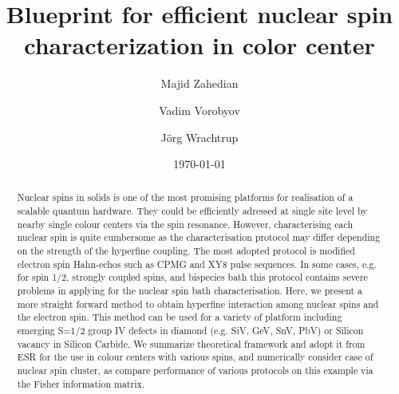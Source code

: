 \documentclass[%
 reprint,
superscriptaddress,
 amsmath,amssymb,
 aps,
]{revtex4-2}
\begin{document}

\title{Blueprint for efficient nuclear spin characterization in  color center}%

\author{Majid Zahedian}


\author{Vadim Vorobyov}

 
\author{J\"org Wrachtrup}

\date{\today}%

\begin{abstract}
Nuclear spins in solids is one of the most promising platforms for realisation of a scalable quantum hardware. They could be efficiently adressed at single site level by nearby single colour centers via the spin resonance. However, characterising each nuclear spin is quite cumbersome as the characterisation protocol may differ depending on the strength of the hyperfine coupling. The most adopted protocol is modified electron spin Hahn-echos such as CPMG and XY8 pulse sequences. In some cases, e.g. for spin 1/2, strongly coupled spins, and bispecies bath this protocol contains severe problems in applying for the nuclear spin bath characterisation. 
Here, we present a more straight forward method to obtain hyperfine interaction among nuclear spins and the electron spin. 
This method can be used for a variety of platform including emerging S=1/2 group IV defects in diamond (e.g. SiV, GeV, SnV, PbV) or Silicon vacancy in Silicon Carbide.
We summarize theoretical framework and adopt it from ESR for the use in colour centers with various spins, and numerically consider case of nuclear spin cluster, as compare performance of various protocols on this example via the Fisher information matrix. 
\end{abstract}
\end{document}
